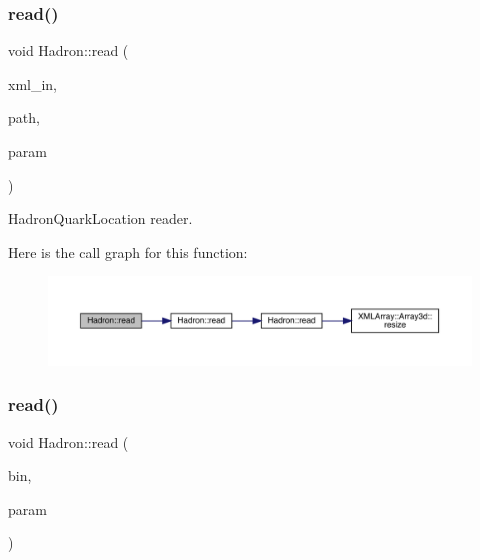 \subsubsection{\texorpdfstring{read()}{read()}\hspace{0.1cm}{\footnotesize\ttfamily [50/94]}}
{\footnotesize\ttfamily void Hadron\+::read (\begin{DoxyParamCaption}\item[{\mbox{\hyperlink{classADATXML_1_1XMLReader}{X\+M\+L\+Reader}} \&}]{xml\+\_\+in,  }\item[{const std\+::string \&}]{path,  }\item[{\mbox{\hyperlink{structHadron_1_1HadronQuarkLocation__t}{Hadron\+Quark\+Location\+\_\+t}} \&}]{param }\end{DoxyParamCaption})}



Hadron\+Quark\+Location reader. 

Here is the call graph for this function\+:\nopagebreak
\begin{figure}[H]
\begin{center}
\leavevmode
\includegraphics[width=350pt]{d1/daf/namespaceHadron_a48b9ff1049a4c339c032065b538ed41f_cgraph}
\end{center}
\end{figure}
\mbox{\label{namespaceHadron_a9478eee791b9cb2c8523893a334602e2}} 
\subsubsection{\texorpdfstring{read()}{read()}\hspace{0.1cm}{\footnotesize\ttfamily [51/94]}}
{\footnotesize\ttfamily void Hadron\+::read (\begin{DoxyParamCaption}\item[{\mbox{\hyperlink{classADATIO_1_1BinaryReader}{Binary\+Reader}} \&}]{bin,  }\item[{\mbox{\hyperlink{structHadron_1_1KeyHadronNPartNPtCorr__t_1_1NPoint__t}{Key\+Hadron\+N\+Part\+N\+Pt\+Corr\+\_\+t\+::\+N\+Point\+\_\+t}} \&}]{param }\end{DoxyParamCaption})}



